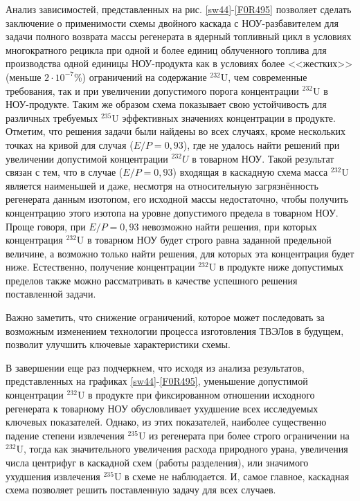 Анализ зависимостей, представленных на рис. \ref{sw44}-\ref{F0R495} позволяет сделать заключение о применимости схемы двойного каскада с НОУ-разбавителем для задачи полного возврата массы регенерата в ядерный топливный цикл в условиях многократного рецикла при одной и более единиц облученного топлива для производства одной единицы НОУ-продукта как в условиях более <<жестких>> (меньше $2\cdot10^{-7}$\%) ограничений на содержание $^{232}$U, чем современные требования, так и при увеличении допустимого порога концентрации $^{232}$U в НОУ-продукте. 
Таким же образом схема показывает свою устойчивость для различных требуемых $^{235}$U эффективных значениях концентрации в продукте. Отметим, что решения задачи были найдены во всех случаях, кроме нескольких точках на кривой для случая ($E/P=0,93$), где не удалось найти решений при увеличении допустимой концентрации $^{232}U$ в товарном НОУ. Такой результат связан с тем, что в случае ($E/P=0,93$) входящая в каскадную схема масса $^{232}$U является наименьшей и даже, несмотря на относительную загрязнённость регенерата данным изотопом, его исходной массы недостаточно, чтобы получить концентрацию этого изотопа на  уровне допустимого предела в товарном НОУ. Проще говоря, при $E/P=0,93$ невозможно найти решения, при которых концентрация $^{232}$U в товарном НОУ будет строго равна заданной предельной величине, а возможно только найти решения, для которых эта концентрация будет ниже. Естественно, получение концентрации $^{232}$U в продукте ниже допустимых пределов также можно рассматривать в качестве успешного решения поставленной задачи.  

Важно заметить, что снижение ограничений, которое может последовать за возможным изменением технологии процесса изготовления ТВЭЛов в будущем, позволит улучшить ключевые характеристики схемы.

В завершении еще раз подчеркнем, что исходя из анализа результатов, представленных на графиках \ref{sw44}-\ref{F0R495}, уменьшение допустимой концентрации $^{232}$U в продукте при фиксированном отношении исходного регенерата к товарному НОУ обусловливает ухудшение всех исследуемых ключевых показателей. Однако, из этих показателей, наиболее существенно падение степени извлечения $^{235}$U из регенерата при более строго ограничении на $^{232}$U, тогда как значительного увеличения расхода природного урана, увеличения числа центрифуг в каскадной схем (работы разделения), или значимого ухудшения извлечения $^{235}$U в схеме не наблюдается. И, самое главное, каскадная схема позволяет решить поставленную задачу для всех случаев.


